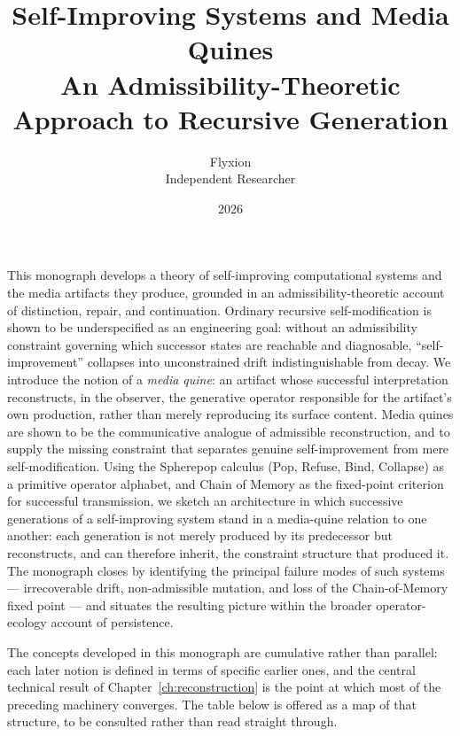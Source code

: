 \documentclass[11pt]{book}
\title{\Huge Self-Improving Systems and Media Quines\\[0.3em]
\Large An Admissibility-Theoretic Approach to Recursive Generation}
\author{Flyxion\\ \small Independent Researcher}
\date{2026}
\begin{document}
\frontmatter

\maketitle

\thispagestyle{empty}
\vspace*{1em}
\par\vspace{0.5em}
\noindent
This monograph develops a theory of self-improving computational systems and the media artifacts they produce, grounded in an admissibility-theoretic account of distinction, repair, and continuation. Ordinary recursive self-modification is shown to be underspecified as an engineering goal: without an admissibility constraint governing which successor states are reachable and diagnosable, ``self-improvement'' collapses into unconstrained drift indistinguishable from decay. We introduce the notion of a \emph{media quine}: an artifact whose successful interpretation reconstructs, in the observer, the generative operator responsible for the artifact's own production, rather than merely reproducing its surface content. Media quines are shown to be the communicative analogue of admissible reconstruction, and to supply the missing constraint that separates genuine self-improvement from mere self-modification. Using the Spherepop calculus (Pop, Refuse, Bind, Collapse) as a primitive operator alphabet, and Chain of Memory as the fixed-point criterion for successful transmission, we sketch an architecture in which successive generations of a self-improving system stand in a media-quine relation to one another: each generation is not merely produced by its predecessor but reconstructs, and can therefore inherit, the constraint structure that produced it. The monograph closes by identifying the principal failure modes of such systems --- irrecoverable drift, non-admissible mutation, and loss of the Chain-of-Memory fixed point --- and situates the resulting picture within the broader operator-ecology account of persistence.

\newpage
\thispagestyle{empty}
\vspace*{1em}
\par\vspace{0.5em}
\noindent
The concepts developed in this monograph are cumulative rather than parallel: each later notion is defined in terms of specific earlier ones, and the central technical result of Chapter~\ref{ch:reconstruction} is the point at which most of the preceding machinery converges. The table below is offered as a map of that structure, to be consulted rather than read straight through.
\end{document}
